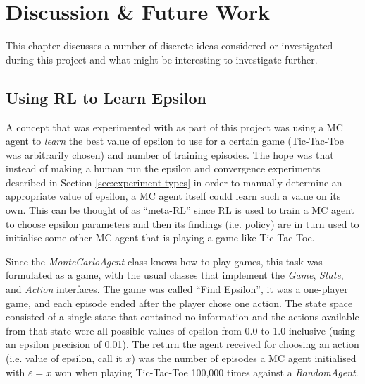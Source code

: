 \documentclass[11pt,a4paper]{report}
\begin{document}
\chapter{Discussion \& Future Work}

This chapter discusses a number of discrete ideas considered or investigated during this project and what might be interesting to investigate further.


\section{Using RL to Learn Epsilon}

A concept that was experimented with as part of this project was using a MC agent to \emph{learn} the best value of epsilon to use for a certain game (Tic-Tac-Toe was arbitrarily chosen) and number of training episodes. The hope was that instead of making a human run the epsilon and convergence experiments described in Section \ref{sec:experiment-types} in order to manually determine an appropriate value of epsilon, a MC agent itself could learn such a value on its own. This can be thought of as ``meta-RL'' since RL is used to train a MC agent to choose epsilon parameters and then its findings (i.e. policy) are in turn used to initialise some other MC agent that is playing a game like Tic-Tac-Toe.

Since the \emph{MonteCarloAgent} class knows how to play games, this task was formulated as a game, with the usual classes that implement the \emph{Game}, \emph{State}, and \emph{Action} interfaces. The game was called ``Find Epsilon'', it was a one-player game, and each episode ended after the player chose one action. The state space consisted of a single state that contained no information and the actions available from that state were all possible values of epsilon from 0.0 to 1.0 inclusive (using an epsilon precision of 0.01). The return the agent received for choosing an action (i.e. value of epsilon, call it $x$) was the number of episodes a MC agent initialised with $\varepsilon = x$ won when playing Tic-Tac-Toe 100,000 times against a \emph{RandomAgent}.
\end{document}
